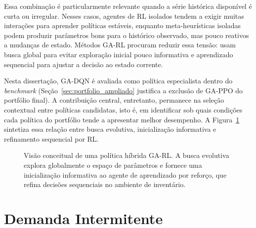 Essa combinação é particularmente relevante quando a série histórica disponível é curta ou irregular. Nesses casos, agentes de RL isolados tendem a exigir muitas interações para aprender políticas estáveis, enquanto meta-heurísticas isoladas podem produzir parâmetros bons para o histórico observado, mas pouco reativos a mudanças de estado. Métodos GA-RL procuram reduzir essa tensão: usam busca global para evitar exploração inicial pouco informativa e aprendizado sequencial para ajustar a decisão ao estado corrente.

Nesta dissertação, GA-DQN é avaliada como política especialista dentro do \textit{benchmark} (Seção~\ref{sec:portfolio_ampliado} justifica a exclusão de GA-PPO do portfólio final). A contribuição central, entretanto, permanece na seleção contextual entre políticas candidatas, isto é, em identificar sob quais condições cada política do portfólio tende a apresentar melhor desempenho. A Figura~\ref{fig:ga_rl_arch} sintetiza essa relação entre busca evolutiva, inicialização informativa e refinamento sequencial por RL.

\begin{figure}[htbp]
\centering
{}
\caption{Visão conceitual de uma política híbrida GA-RL. A busca evolutiva explora globalmente o espaço de parâmetros e fornece uma inicialização informativa ao agente de aprendizado por reforço, que refina decisões sequenciais no ambiente de inventário.}
\label{fig:ga_rl_arch}
\end{figure}

\section{Demanda Intermitente}

